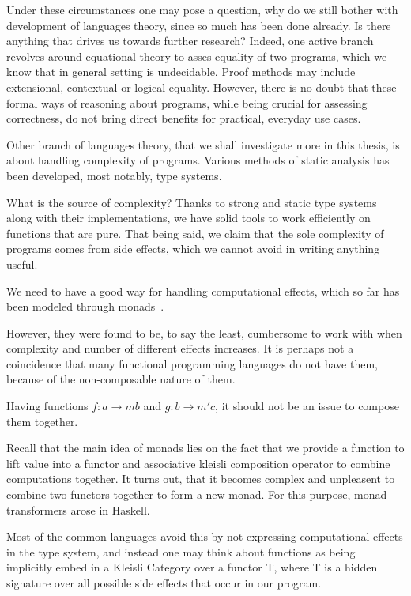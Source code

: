 \documentclass[declaration,shortabstract]{iithesis}
\theoremstyle{definition} \newtheorem{definition}{Definition}[chapter]
\theoremstyle{remark} \newtheorem{remark}[definition]{Observation}
\theoremstyle{plain} \newtheorem{theorem}[definition]{Theorem}
\theoremstyle{plain} \newtheorem{lemma}[definition]{Lemma}
\begin{document}
Under these circumstances one may pose a question, why do we still bother with
development of languages theory, since so much has been done already. Is there
anything that drives us towards further research? Indeed, one active branch
revolves around equational theory to asses equality of two programs, which we
know that in general setting is undecidable. Proof methods may include extensional,
contextual or logical equality. However, there is no doubt that these formal
ways of reasoning about programs, while being crucial for assessing correctness,
do not bring direct benefits for practical, everyday use cases.

Other branch of languages theory, that we shall investigate more in this thesis,
is about handling complexity of programs. Various methods of static analysis has
been developed, most notably, type systems.

What is the source of complexity? Thanks to strong and static type systems along
with their implementations, we have solid tools to work efficiently on functions
that are pure. That being said, we claim that the sole complexity of programs
comes from side effects, which we cannot avoid in writing anything useful.

We need to have a good way for handling computational effects, which so far has
been modeled through monads~\cite{moggi}.

However, they were found to be, to say the least, cumbersome to work with when
complexity and number of different effects increases. It is perhaps not a coincidence
that many functional programming languages do not have them, because of the
non-composable nature of them.

Having functions $ f: a \rightarrow m b $ and $ g : b \rightarrow m' c $, it
should not be an issue to compose them together.

Recall that the main idea of monads lies on the fact that we provide a function
to lift value into a functor and associative kleisli composition operator to combine
computations together. It turns out, that it becomes complex and unpleasent to
combine two functors together to form a new monad. For this purpose, monad
transformers arose in Haskell.

Most of the common languages avoid this by not expressing computational effects
in the type system, and instead one may think about functions as being implicitly
embed in a Kleisli Category over a functor T, where T is a hidden signature over
all possible side effects that occur in our program.
\end{document}
